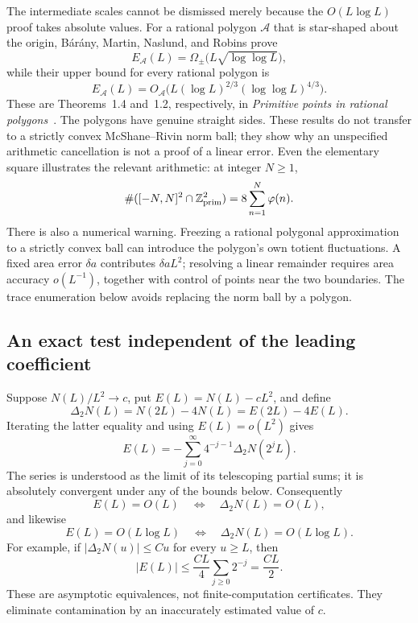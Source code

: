 \documentclass[11pt,a4paper]{article}
\numberwithin{equation}{section}
\theoremstyle{definition}
\theoremstyle{remark}
\begin{document}
The intermediate scales cannot be dismissed merely because the
$O(L\log L)$ proof takes absolute values. For a rational polygon
$\mathcal A$ that is star-shaped about the origin, B\'ar\'any,
Martin, Naslund, and Robins prove
\[
 E_{\mathcal A}(L)
 =\Omega_\pm\bigl(L\sqrt{\log\log L}\bigr),
\]
while their upper bound for every rational polygon is
\[
 E_{\mathcal A}(L)
 =O_{\mathcal A}\bigl(L(\log L)^{2/3}
                         (\log\log L)^{4/3}\bigr).
\]
These are Theorems~1.4 and~1.2, respectively, in
\emph{Primitive points in rational polygons}~\cite{BaranyPrimitivePolygons}.
The polygons have genuine straight sides. These results do not
transfer to a strictly convex McShane--Rivin norm ball; they show
why an unspecified arithmetic cancellation is not a proof of a
linear error. Even the elementary square illustrates the relevant
arithmetic: at integer $N\ge1$,
\[
 \#([-N,N]^2\cap\mathbb Z^2_{\rm prim})
 =8\sum_{n=1}^N\varphi(n).
\]
There is also a numerical warning. Freezing a rational polygonal
approximation to a strictly convex ball can introduce the polygon's own
totient fluctuations. A fixed area error $\delta a$ contributes
$\delta a L^2$; resolving a linear remainder requires area accuracy
$o(L^{-1})$, together with control of points near the two boundaries.
The trace enumeration below avoids replacing the norm ball by a polygon.

\subsection{An exact test independent of the leading coefficient}
\label{subsec:dyadicdiagnostic}

Suppose $N(L)/L^2\to c$, put $E(L)=N(L)-cL^2$, and define
\[
 \Delta_2N(L)=N(2L)-4N(L)=E(2L)-4E(L).
\]
Iterating the latter equality and using $E(L)=o(L^2)$ gives
\begin{equation}
 E(L)=-\sum_{j=0}^\infty4^{-j-1}\Delta_2N(2^jL).
 \label{eq:dyadicerrorinverse}
\end{equation}
The series is understood as the limit of its telescoping partial
sums; it is absolutely convergent under any of the bounds below.
Consequently
\[
 E(L)=O(L)\quad\Longleftrightarrow\quad
 \Delta_2N(L)=O(L),
\]
and likewise
\[
 E(L)=O(L\log L)\quad\Longleftrightarrow\quad
 \Delta_2N(L)=O(L\log L).
\]
For example, if $|\Delta_2N(u)|\le Cu$ for every $u\ge L$, then
\[
 |E(L)|\le\frac{CL}{4}\sum_{j\ge0}2^{-j}=\frac{CL}{2}.
\]
These are asymptotic equivalences, not finite-computation certificates.
They eliminate contamination by an inaccurately estimated value of $c$.
\end{document}
